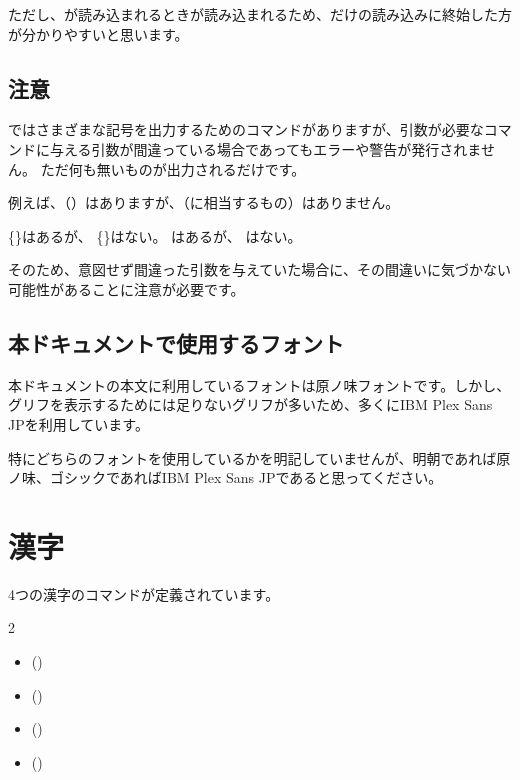 \documentclass[uplatex, dvipdfmx, paper=a4paper, line_length=45zw, head_space=7zw, foot_space=10zw]{jlreq}
\begin{document}
\begin{texsource}
\usepackage{ajmacros}
\end{texsource}

ただし、が読み込まれるときが読み込まれるため、だけの読み込みに終始した方が分かりやすいと思います。

\vfil
\subsection{注意}

ではさまざまな記号を出力するためのコマンドがありますが、引数が必要なコマンドに与える引数が間違っている場合であってもエラーや警告が発行されません。
ただ何も無いものが出力されるだけです。

例えば、（{\ibmfamily{}}）はありますが、（{\ibmfamily{}}に相当するもの）はありません。

\begin{demosource}
  \{\}はあるが、
  \{\}はない。
  \tcblower
  {\ibmfamily{}}はあるが、
  はない。
\end{demosource}

そのため、意図せず間違った引数を与えていた場合に、その間違いに気づかない可能性があることに注意が必要です。

\vfil
\subsection{本ドキュメントで使用するフォント}

本ドキュメントの本文に利用しているフォントは原ノ味フォントです。しかし、グリフを表示するためには足りないグリフが多いため、多くにIBM Plex Sans JPを利用しています。

特にどちらのフォントを使用しているかを明記していませんが、明朝であれば原ノ味、ゴシックであればIBM Plex Sans JPであると思ってください。

\newpage

\section{漢字}

4つの漢字のコマンドが定義されています。

\begin{multicols}{2}
  \begin{itemize}
    \item {}
       \ajHashigoTaka ()
    \item {}
       \ajTsuchiYoshi ()
    \item {}
       \ajTatsuSaki ()
    \item {}
       \ajMayuHama ()
  \end{itemize}
\end{multicols}
\end{document}
